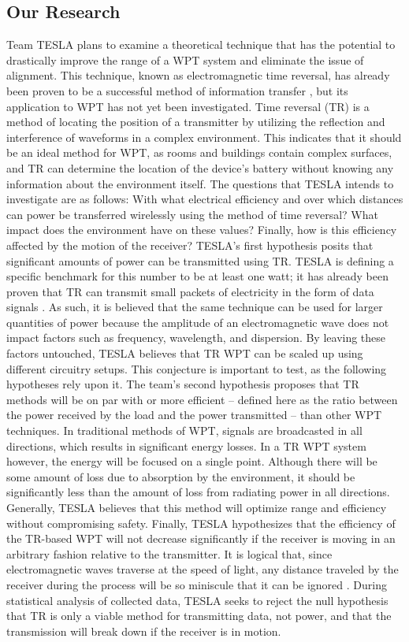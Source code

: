 \subsection{Our Research}
Team TESLA plans to examine a theoretical technique that has the potential to drastically improve the range of a WPT system and eliminate the issue of alignment. This technique, known as electromagnetic time reversal, has already been proven to be a successful method of information transfer \cite{nltr-wave-chaotic}\cite{cepni2005experimental}, but its application to WPT has not yet been investigated. Time reversal (TR) is a method of locating the position of a transmitter by utilizing the reflection and interference of waveforms in a complex environment. This indicates that it should be an ideal method for WPT, as rooms and buildings contain complex surfaces, and TR can determine the location of the device’s battery without knowing any information about the environment itself.
The questions that TESLA intends to investigate are as follows: With what electrical efficiency and over which distances can power be transferred wirelessly using the method of time reversal? What impact does the environment have on these values? Finally, how is this efficiency affected by the motion of the receiver?
TESLA’s first hypothesis posits that significant amounts of power can be transmitted using TR. TESLA is defining a specific benchmark for this number to be at least one watt; it has already been proven that TR can transmit small packets of electricity in the form of data signals \cite{nltr-wave-chaotic}. As such, it is believed that the same technique can be used for larger quantities of power because the amplitude of an electromagnetic wave does not impact factors such as frequency, wavelength, and dispersion. By leaving these factors untouched, TESLA believes that TR WPT can be scaled up using different circuitry setups. This conjecture is important to test, as the following hypotheses rely upon it.
The team’s second hypothesis proposes that TR methods will be on par with or more efficient – defined here as the ratio between the power received by the load and the power transmitted – than other WPT techniques. In traditional methods of WPT, signals are broadcasted in all directions, which results in significant energy losses. In a TR WPT system however, the energy will be focused on a single point. Although there will be some amount of loss due to absorption by the environment, it should be significantly less than the amount of loss from radiating power in all directions. Generally, TESLA believes that this method will optimize range and efficiency without compromising safety.
Finally, TESLA hypothesizes that the efficiency of the TR-based WPT will not decrease significantly if the receiver is moving in an arbitrary fashion relative to the transmitter. It is logical that, since electromagnetic waves traverse at the speed of light, any distance traveled by the receiver during the process will be so miniscule that it can be ignored \cite{liu2007electromagnetic}. During statistical analysis of collected data, TESLA seeks to reject the null hypothesis that TR is only a viable method for transmitting data, not power, and that the transmission will break down if the receiver is in motion.
